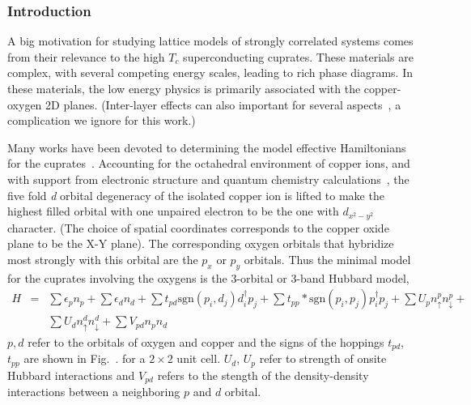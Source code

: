 \documentclass[prl,12pt,onecolumn,nofootinbib,notitlepage,english,superscriptaddress]{revtex4-1}
\newcommand{\HJC}[1]{{\color{RED}{\bf HJC: #1}}}
\begin{document}
\subsubsection{Introduction}
A big motivation for studying lattice models of strongly correlated systems comes from their 
relevance to the high $T_c$ superconducting cuprates. These materials are complex, with several 
competing energy scales, leading to rich phase diagrams. In these materials, 
the low energy physics is primarily associated with the copper-oxygen 2D planes. 
(Inter-layer effects can also important for several aspects~\cite{}, a complication we ignore 
for this work.) 

Many works have been devoted to determining the model effective Hamiltonians 
for the cuprates~\cite{Hybertsen}. Accounting for the octahedral environment of copper ions, 
and with support from electronic structure and quantum chemistry calculations~\cite{Dagotto}, the five fold 
\emph{d} orbital degeneracy of the isolated copper ion is lifted to make the 
highest filled orbital with one unpaired electron to be the one with $d_{x^2-y^2}$ character. 
(The choice of spatial coordinates corresponds to the copper oxide plane to be the X-Y plane). 
The corresponding oxygen orbitals that hybridize most strongly with this orbital are the $p_x$ or $p_y$ orbitals. 
Thus the minimal model for the cuprates involving the oxygens 
is the 3-orbital or 3-band Hubbard model, 
\begin{eqnarray}
H &=& \sum \epsilon_p n_p + \sum \epsilon_d n_d + \sum t_{pd} \text{sgn}(p_i,d_j) d_i^{\dagger} p_j + 
      \sum t_{pp} * \text{sgn}(p_i,p_j) p_i^{\dagger} p_j + \sum U_p n^{p}_{\uparrow} n^{p}_{\downarrow} + \\
  & & \sum U_d n^{d}_{\uparrow} n^{d}_{\downarrow} + \sum V_{pd} n_p n_d 
\end{eqnarray}
$p,d$ refer to the orbitals of oxygen and copper and the signs of the hoppings $t_{pd}$, $t_{pp}$ are 
shown in Fig.~. for a $2 \times 2$ unit cell. $U_d$, $U_p$ refer to strength of onsite Hubbard 
interactions and $V_{pd}$ refers to the stength of the density-density interactions between a neighboring 
$p$ and $d$ orbital.
\end{document}
